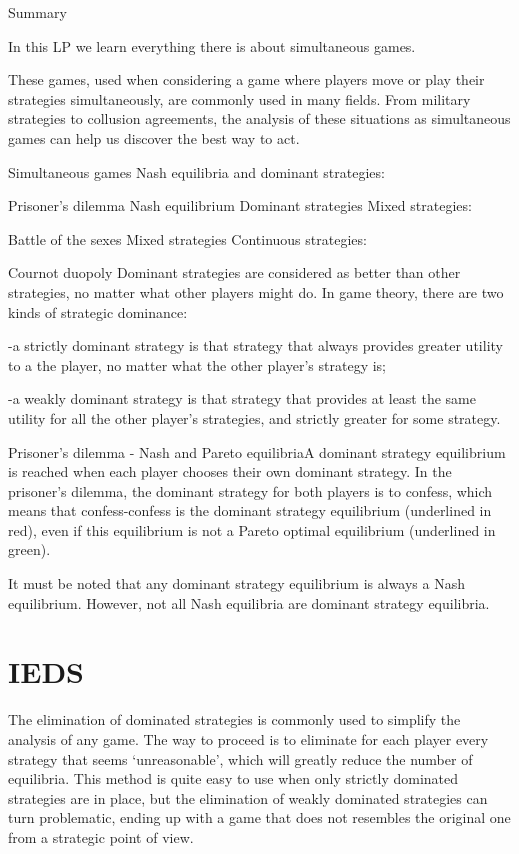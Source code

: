 Summary

In this LP we learn everything there is about simultaneous games. 

These games, used when considering a game where players move or play their strategies simultaneously, are commonly used in many fields. From military strategies to collusion agreements, the analysis of these situations as simultaneous games can help us discover the best way to act.

Simultaneous games
Nash equilibria and dominant strategies:

Prisoner’s dilemma
Nash equilibrium
Dominant strategies
Mixed strategies:

Battle of the sexes
Mixed strategies
Continuous strategies:

Cournot duopoly
Dominant strategies are considered as better than other strategies, no matter what other players might do. In game theory, there are two kinds of strategic dominance:

-a strictly dominant strategy is that strategy that always provides greater utility to a the player, no matter what the other player’s strategy is;

-a weakly dominant strategy is that strategy that provides at least the same utility for all the other player’s strategies, and strictly greater for some strategy.

 

Prisoner's dilemma - Nash and Pareto equilibriaA dominant strategy equilibrium is reached when each player chooses their own dominant strategy. In the prisoner’s dilemma, the dominant strategy for both players is to confess, which means that confess-confess is the dominant strategy equilibrium (underlined in red), even if this equilibrium is not a Pareto optimal equilibrium (underlined in green).

It must be noted that any dominant strategy equilibrium is always a Nash equilibrium. However, not all Nash equilibria are dominant strategy equilibria.

 
\section{IEDS}
The elimination of dominated strategies is commonly used to simplify the analysis of any game. The way to proceed is to eliminate for each player every strategy that seems ‘unreasonable’, which will greatly reduce the number of equilibria. This method is quite easy to use when only strictly dominated strategies are in place, but the elimination of weakly dominated strategies can turn problematic, ending up with a game that does not resembles the original one from a strategic point of view.

